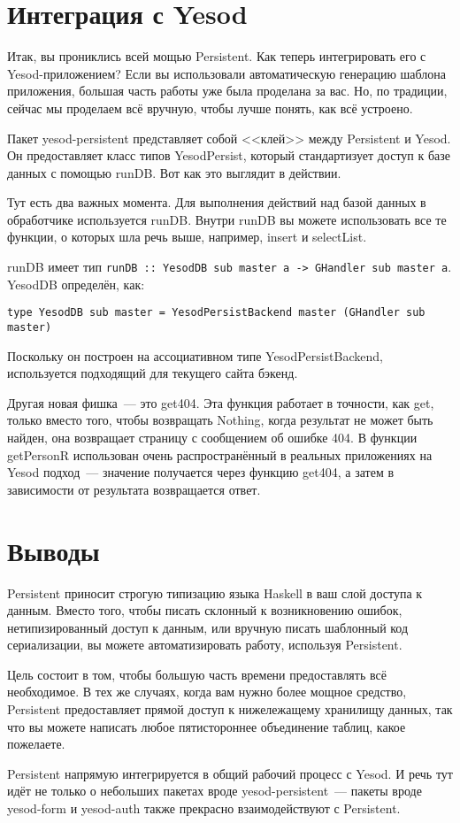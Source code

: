 \section{Интеграция с Yesod}

Итак, вы прониклись всей мощью Persistent. Как теперь интегрировать его с Yesod-приложением? Если вы использовали автоматическую генерацию шаблона приложения, большая часть работы уже была проделана за вас. Но, по традиции, сейчас мы проделаем всё вручную, чтобы лучше понять, как всё устроено.

Пакет yesod-persistent представляет собой <<клей>> между Persistent и Yesod. Он предоставляет класс типов YesodPersist, который стандартизует доступ к базе данных с помощью runDB. Вот как это выглядит в действии.


Тут есть два важных момента. Для выполнения действий над базой данных в обработчике используется runDB. Внутри runDB вы можете использовать все те функции, о которых шла речь выше, например, insert и selectList. 

\begin{remark}
runDB имеет тип \lstinline'runDB :: YesodDB sub master a -> GHandler sub master a'. YesodDB определён, как:

\begin{lstlisting}
type YesodDB sub master = YesodPersistBackend master (GHandler sub master)
\end{lstlisting}

Поскольку он построен на ассоциативном типе YesodPersistBackend, используется подходящий для текущего сайта бэкенд.
\end{remark}

Другая новая фишка~--- это get404. Эта функция работает в точности, как get, только вместо того, чтобы возвращать Nothing, когда результат не может быть найден, она возвращает страницу с сообщением об ошибке 404. В функции getPersonR использован очень распространённый в реальных приложениях на Yesod подход~--- значение получается через функцию get404, а затем в зависимости от результата возвращается ответ.

\section{Выводы}

Persistent приносит строгую типизацию языка Haskell в ваш слой доступа к данным. Вместо того, чтобы писать склонный к возникновению ошибок, нетипизированный доступ к данным, или вручную писать шаблонный код сериализации, вы можете автоматизировать работу, используя Persistent.

Цель состоит в том, чтобы большую часть времени предоставлять всё необходимое. В тех же случаях, когда вам нужно более мощное средство, Persistent предоставляет прямой доступ к нижележащему хранилищу данных, так что вы можете написать любое пятистороннее объединение таблиц, какое пожелаете.

Persistent напрямую интегрируется в общий рабочий процесс с Yesod. И речь тут идёт не только о небольших пакетах вроде yesod-persistent~--- пакеты вроде yesod-form и yesod-auth также прекрасно взаимодействуют с Persistent.
